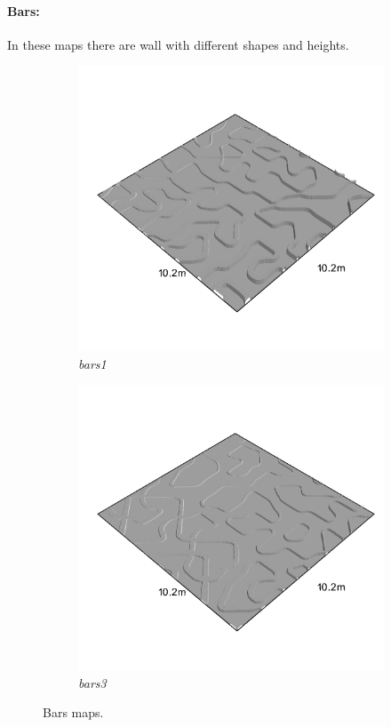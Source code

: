 \documentclass[../document.tex]{subfiles}
\begin{document}
\paragraph{Bars:} In these maps there are wall with different shapes and heights. 
\begin{figure}[H]
    \centering
        \begin{subfigure}[b]{0.23\textwidth}
            \includegraphics[width=\textwidth]{../img/hm3d_borders/bars1.png}
            \caption{\emph{bars1}}
        \end{subfigure}
        \begin{subfigure}[b]{0.23 \linewidth}
            \includegraphics[width=\textwidth]{../img/hm3d_borders/bars3.png}
            \caption{\emph{bars3}}
            \end{subfigure}     
    \caption{Bars maps.}
    \label{fig : bars-maps}
\end{figure}
\end{document}
